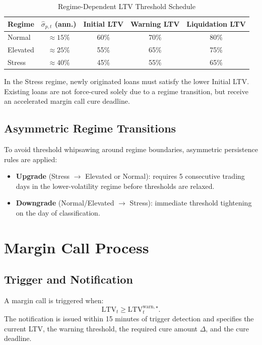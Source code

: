 \documentclass[12pt, a4paper]{article}
\newcommand{\LTV}{\mathrm{LTV}}
\newcommand{\1}{\mathbbm{1}}
\begin{document}
\begin{table}[H]
\centering
\caption{Regime-Dependent LTV Threshold Schedule}
\label{tab:thresholds}
\begin{tabular}{lcccc}
\toprule
\textbf{Regime} & $\hat{\sigma}_{p,t}$ (ann.) & \textbf{Initial LTV} & \textbf{Warning LTV} & \textbf{Liquidation LTV} \\
\midrule
Normal   & $\approx 15\%$ & 60\% & 70\% & 80\% \\
Elevated & $\approx 25\%$ & 55\% & 65\% & 75\% \\
Stress   & $\approx 40\%$ & 45\% & 55\% & 65\% \\
\bottomrule
\end{tabular}
\end{table}

\noindent In the Stress regime, newly originated loans must satisfy the lower
Initial LTV. Existing loans are not force-cured solely due to a regime transition,
but receive an accelerated margin call cure deadline.

\subsection{Asymmetric Regime Transitions}

To avoid threshold whipsawing around regime boundaries, asymmetric persistence
rules are applied:
\begin{itemize}[leftmargin=1.5em]
    \item \textbf{Upgrade} (Stress $\to$ Elevated or Normal): requires 5 consecutive
    trading days in the lower-volatility regime before thresholds are relaxed.
    \item \textbf{Downgrade} (Normal/Elevated $\to$ Stress): immediate threshold
    tightening on the day of classification.
\end{itemize}

\section{Margin Call Process}
\label{sec:margin_call}

\subsection{Trigger and Notification}

A margin call is triggered when:
\[
\LTV_t \geq \LTV^{\mathrm{warn},\star}_t.
\]
The notification is issued within 15 minutes of trigger detection and specifies
the current LTV, the warning threshold, the required cure amount $\Delta$, and the
cure deadline.
\end{document}

